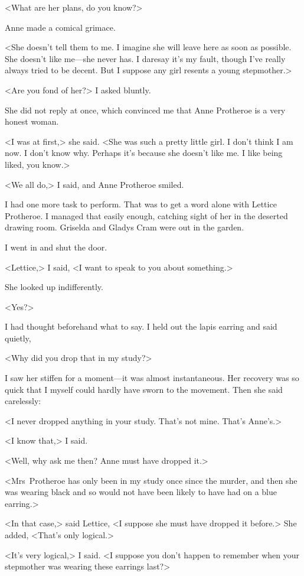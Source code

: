 <What are her plans, do you know?>

Anne made a comical grimace.

<She doesn't tell them to me. I imagine she will leave here as soon as possible. She doesn't like me—she never has. I daresay it's my fault, though I've really always tried to be decent. But I suppose any girl resents a young stepmother.>

<Are you fond of her?> I asked bluntly.

She did not reply at once, which convinced me that Anne Protheroe is a very honest woman.

<I was at first,> she said. <She was such a pretty little girl. I don't think I am now. I don't know why. Perhaps it's because she doesn't like me. I like being liked, you know.>

<We all do,> I said, and Anne Protheroe smiled.

I had one more task to perform. That was to get a word alone with Lettice Protheroe. I managed that easily enough, catching sight of her in the deserted drawing room. Griselda and Gladys Cram were out in the garden.

I went in and shut the door.

<Lettice,> I said, <I want to speak to you about something.>

She looked up indifferently.

<Yes?>

I had thought beforehand what to say. I held out the lapis earring and said quietly,

<Why did you drop that in my study?>

I saw her stiffen for a moment—it was almost instantaneous. Her recovery was so quick that I myself could hardly have sworn to the movement. Then she said carelessly:

<I never dropped anything in your study. That's not mine. That's Anne's.>

<I know that,> I said.

<Well, why ask me then? Anne must have dropped it.>

<Mrs~Protheroe has only been in my study once since the murder, and then she was wearing black and so would not have been likely to have had on a blue earring.>

<In that case,> said Lettice, <I suppose she must have dropped it before.> She added, <That's only logical.>

<It's very logical,> I said. <I suppose you don't happen to remember when your stepmother was wearing these earrings last?>


